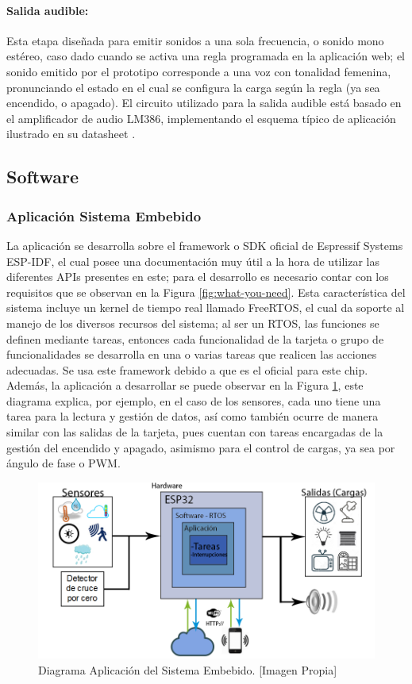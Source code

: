	\paragraph{Salida audible:}
		Esta etapa diseñada para emitir sonidos a una sola frecuencia, o sonido mono estéreo, caso dado cuando se activa una regla programada en la aplicación web; el sonido emitido por el prototipo corresponde a una voz con tonalidad femenina, pronunciando el estado en el cual se configura la carga según la regla (ya sea encendido, o apagado).	El circuito utilizado para la salida audible está basado en el amplificador de audio LM386, implementando el esquema típico de aplicación ilustrado en su datasheet \cite{LM386}.
				
\subsection{Software}

\subsubsection{Aplicación Sistema Embebido}
La aplicación se desarrolla sobre el framework o SDK oficial de Espressif Systems ESP-IDF, el cual posee una documentación \cite{ES} muy útil a la hora de utilizar las diferentes APIs presentes en este; para el desarrollo es necesario contar con los requisitos que se observan en la Figura \ref{fig:what-you-need}. Esta característica del sistema incluye un kernel de tiempo real llamado FreeRTOS, el cual da soporte al manejo de los diversos recursos del sistema; al ser un RTOS, las funciones se definen mediante tareas, entonces cada funcionalidad de la tarjeta o grupo de funcionalidades se desarrolla en una o varias tareas que realicen las acciones adecuadas. Se usa este framework debido a que es el oficial para este chip.\\

Además, la aplicación a desarrollar se puede observar en la Figura \ref{fig:App}, este diagrama explica, por ejemplo, en el caso de los sensores, cada uno tiene una tarea para la lectura y gestión de datos, así como también ocurre de manera similar con las salidas de la tarjeta, pues cuentan con tareas encargadas de la gestión del encendido y apagado, asimismo para el control de cargas, ya sea por ángulo de fase o PWM.\\

\begin{figure}[!t]
	\centering
	\caption[Diagrama Aplicación del Sistema Embebido.]{Diagrama Aplicación del Sistema Embebido. [Imagen Propia]}
	\label{fig:App}
	\includegraphics[width=0.7\linewidth]{Imagenes/B_Aplicacion}
\end{figure}

